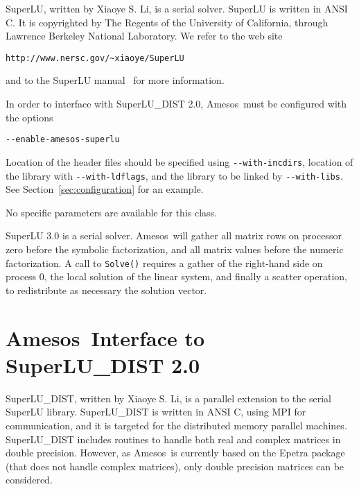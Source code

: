 \documentclass[11pt]{SANDreport}
\newcommand{\amesos}{{\sc Amesos}}
\begin{document}
SuperLU, written by Xiaoye S. Li, is a serial solver.  SuperLU is
written in ANSI C. It is copyrighted by The Regents of the University of
California, through Lawrence Berkeley National Laboratory.  We refer to
the web site
\begin{verbatim}
http://www.nersc.gov/~xiaoye/SuperLU
\end{verbatim}
and to the SuperLU manual~\cite{superlu-manual} for more
information.

\medskip

In order to interface with SuperLU\_DIST 2.0, \amesos\ must be configured with
the options
\begin{verbatim}
--enable-amesos-superlu 
\end{verbatim}
Location of the header files should be specified using \verb!--with-incdirs!,
location of the library with \verb!--with-ldflags!, and the library
to be linked by \verb!--with-libs!. See Section~\ref{sec:configuration} for an
example.

\smallskip

No specific parameters are available for this class.

\smallskip

SuperLU 3.0 is a serial solver. \amesos\ will gather all matrix rows on processor
zero before the symbolic factorization, and all matrix values before the
numeric factorization. A call to \verb!Solve()! requires a gather
of the right-hand side on process 0, the local solution of the linear
system, and finally a scatter operation, to redistribute as necessary the
solution vector.

\section{\amesos\ Interface to SuperLU\_DIST 2.0}
\label{sec:superludist}

SuperLU\_DIST, written by Xiaoye S. Li, is a parallel extension to the
serial SuperLU library.  SuperLU\_DIST is written in ANSI C, using MPI
for communication, and it is targeted for the distributed memory
parallel machines.  SuperLU\_DIST includes routines to handle both real
and complex matrices in double precision. However, as \amesos\ is
currently based on the Epetra package (that does not handle complex
matrices), only double precision matrices can be considered.
\end{document}
